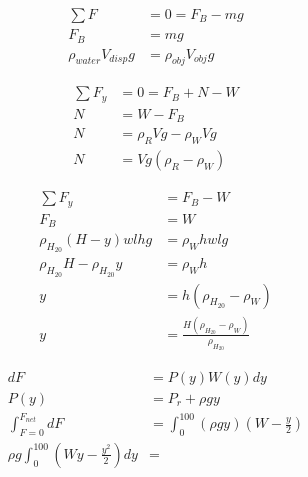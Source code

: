 \begin{problem}
    \[
    \begin{aligned}
        \sum F &= 0 = F_B - mg\\
        F_B &= mg\\
        \rho_{water}V_{disp}g &= \rho_{obj}V_{obj}g
    \end{aligned}    
    \]
\end{problem}


\begin{problem}
    \[
    \begin{aligned}
        \sum F_y &= 0 = F_B + N - W\\
        N &= W - F_B\\
        N &= \rho_RVg - \rho_WVg\\
        N &= Vg(\rho_R-\rho_W)
    \end{aligned}    
    \]
\end{problem}

\begin{problem}
    \[
    \begin{aligned}
        \sum F_y &= F_B - W\\
        F_B &= W\\
        \rho_{H_20}(H-y)wlhg &= \rho_Whwlg\\
        \rho_{H_20}H - \rho_{H_20}y &= \rho_Wh\\
        y &= h(\rho_{H_20} - \rho_W)\\
        y &= \frac{H(\rho_{H_20}-\rho_W)}{\rho_{H_20}}
    \end{aligned}    
    \]
\end{problem}

\begin{problem}
    \[
    \begin{aligned}
        dF &= P(y)W(y)dy\\
        P(y) &= P_r + \rho g y\\
        \int_{F = 0}^{F_{net}}dF &= \int_0^{100}(\rho gy)\left(W-\frac{y}{2}\right)\\
        \rho g \int_0^{100}\left(Wy - \frac{y^2}{2}\right)dy &=
    \end{aligned}     
    \]
\end{problem}